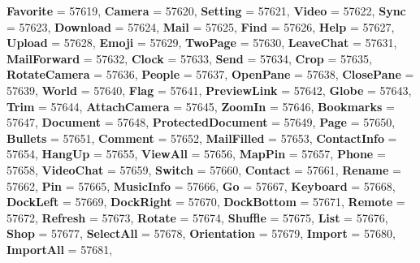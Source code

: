 \begin{DoxyCompactItemize}
{\bfseries Favorite} = 57619, 
\newline
{\bfseries Camera} = 57620, 
{\bfseries Setting} = 57621, 
{\bfseries Video} = 57622, 
{\bfseries Sync} = 57623, 
\newline
{\bfseries Download} = 57624, 
{\bfseries Mail} = 57625, 
{\bfseries Find} = 57626, 
{\bfseries Help} = 57627, 
\newline
{\bfseries Upload} = 57628, 
{\bfseries Emoji} = 57629, 
{\bfseries Two\+Page} = 57630, 
{\bfseries Leave\+Chat} = 57631, 
\newline
{\bfseries Mail\+Forward} = 57632, 
{\bfseries Clock} = 57633, 
{\bfseries Send} = 57634, 
{\bfseries Crop} = 57635, 
\newline
{\bfseries Rotate\+Camera} = 57636, 
{\bfseries People} = 57637, 
{\bfseries Open\+Pane} = 57638, 
{\bfseries Close\+Pane} = 57639, 
\newline
{\bfseries World} = 57640, 
{\bfseries Flag} = 57641, 
{\bfseries Preview\+Link} = 57642, 
{\bfseries Globe} = 57643, 
\newline
{\bfseries Trim} = 57644, 
{\bfseries Attach\+Camera} = 57645, 
{\bfseries Zoom\+In} = 57646, 
{\bfseries Bookmarks} = 57647, 
\newline
{\bfseries Document} = 57648, 
{\bfseries Protected\+Document} = 57649, 
{\bfseries Page} = 57650, 
{\bfseries Bullets} = 57651, 
\newline
{\bfseries Comment} = 57652, 
{\bfseries Mail\+Filled} = 57653, 
{\bfseries Contact\+Info} = 57654, 
{\bfseries Hang\+Up} = 57655, 
\newline
{\bfseries View\+All} = 57656, 
{\bfseries Map\+Pin} = 57657, 
{\bfseries Phone} = 57658, 
{\bfseries Video\+Chat} = 57659, 
\newline
{\bfseries Switch} = 57660, 
{\bfseries Contact} = 57661, 
{\bfseries Rename} = 57662, 
{\bfseries Pin} = 57665, 
\newline
{\bfseries Music\+Info} = 57666, 
{\bfseries Go} = 57667, 
{\bfseries Keyboard} = 57668, 
{\bfseries Dock\+Left} = 57669, 
\newline
{\bfseries Dock\+Right} = 57670, 
{\bfseries Dock\+Bottom} = 57671, 
{\bfseries Remote} = 57672, 
{\bfseries Refresh} = 57673, 
\newline
{\bfseries Rotate} = 57674, 
{\bfseries Shuffle} = 57675, 
{\bfseries List} = 57676, 
{\bfseries Shop} = 57677, 
\newline
{\bfseries Select\+All} = 57678, 
{\bfseries Orientation} = 57679, 
{\bfseries Import} = 57680, 
{\bfseries Import\+All} = 57681, 

\end{DoxyCompactItemize}
